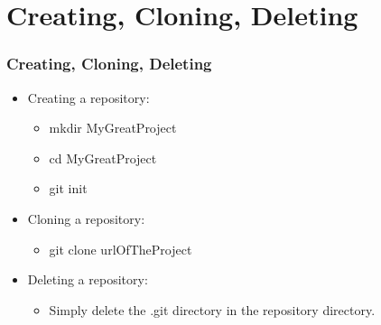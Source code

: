 \documentclass{beamer}
\begin{document}
\section{Creating, Cloning, Deleting}
\begin{frame}
\frametitle{Creating, Cloning, Deleting}
\begin{itemize}
\pause
\item Creating a repository:
	\begin{itemize}
	\pause
	\item mkdir MyGreatProject
	\pause
	\item cd MyGreatProject
	\pause
	\item git init
	\end{itemize}
\pause
\item Cloning a repository:
	\begin{itemize}
	\pause
	\item git clone urlOfTheProject
	\end{itemize}
\pause
\item Deleting a repository:
	\begin{itemize}
	\pause
	\item Simply delete the .git directory in the repository directory.
	\end{itemize}
\end{itemize}
\end{frame}
\end{document}
